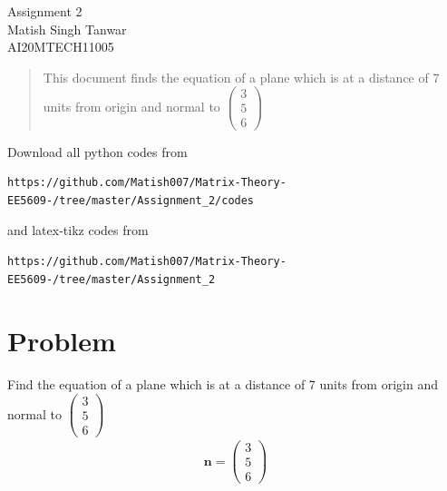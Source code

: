 \documentclass[journal,12pt,twocolumn]{IEEEtran}
\begin{document}
\begin{center}
\huge Assignment 2\\

\large Matish Singh Tanwar\\
\large AI20MTECH11005\\
\end{center}
\vspace{1.0cm}
\begin{abstract}
This document finds the equation of a plane which is at a distance of 7 units from origin and normal to $\begin{pmatrix}3\\5\\6\end{pmatrix}$
\end{abstract}
\vspace{0.5cm}
Download all python codes from 
\begin{lstlisting}
https://github.com/Matish007/Matrix-Theory-EE5609-/tree/master/Assignment_2/codes
\end{lstlisting}
%
and latex-tikz codes from 
\begin{lstlisting}
https://github.com/Matish007/Matrix-Theory-EE5609-/tree/master/Assignment_2
\end{lstlisting}
%
\vspace{0.5mm}
\section{Problem}
Find the equation of a plane which is at a distance of 7 units from origin and normal to $\begin{pmatrix}3\\5\\6\end{pmatrix}$\\
\begin{align}
    \mathbf{n}=\begin{pmatrix}3\\5\\6\end{pmatrix}
\end{align}
\end{document}
